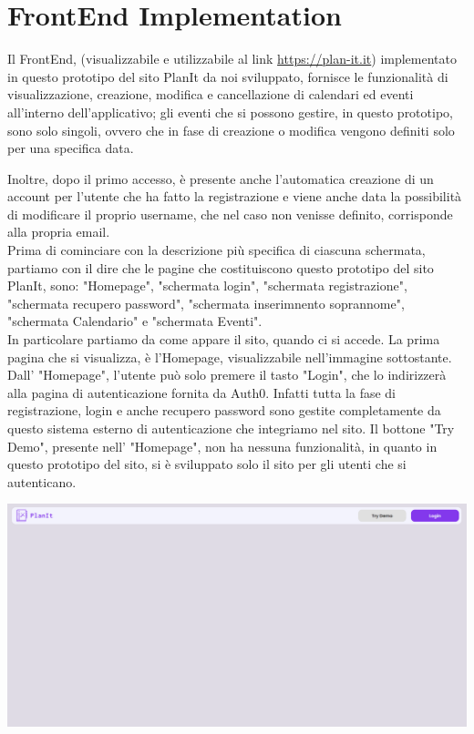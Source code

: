 \section{FrontEnd Implementation}
\label{secD4:FrontEndImplementation}
Il FrontEnd, (visualizzabile e utilizzabile al link \url{https://plan-it.it}) implementato in questo prototipo del sito PlanIt da noi sviluppato, fornisce le funzionalità di visualizzazione, creazione, modifica e cancellazione di calendari ed eventi all'interno dell'applicativo; gli eventi che si possono gestire, in questo prototipo, sono solo singoli, ovvero che in fase di creazione o modifica vengono definiti solo per una specifica data.

Inoltre, dopo il primo accesso, è presente anche l'automatica creazione di un account per l'utente che ha fatto la registrazione e viene anche data la possibilità di modificare il proprio username, che nel caso non venisse definito, corrisponde alla propria email. \\ Prima di cominciare con la descrizione più specifica di ciascuna schermata, partiamo con il dire che le pagine che costituiscono questo prototipo del sito PlanIt, sono: "Homepage", "schermata login", "schermata registrazione", "schermata recupero password", "schermata inserimnento soprannome", "schermata Calendario" e "schermata Eventi".
\\ In particolare partiamo da come appare il sito, quando ci si accede. La prima pagina che si visualizza, è l'Homepage, visualizzabile nell'immagine sottostante. Dall' "Homepage", l'utente può solo premere il tasto "Login", che lo indirizzerà alla pagina di autenticazione fornita da Auth0. Infatti tutta la fase di registrazione, login e anche recupero password sono gestite completamente da questo sistema esterno di autenticazione che integriamo nel sito. Il bottone "Try Demo", presente nell' "Homepage", non ha nessuna funzionalità, in quanto in questo prototipo del sito, si è sviluppato solo il sito per gli utenti che si autenticano.
\begin{center}
    \includegraphics[width=1\textwidth, height=0.3\textheight]{img/png/FrontEnd/Homepage_Autenticazione/Homepage.png}
\end{center}
